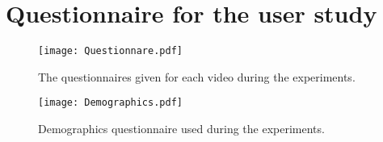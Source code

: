 \chapter{Questionnaire for the user study}
\begin{figure}[hbt!]
    \centering
    \texttt{[image: Questionnare.pdf]}
    \caption{The questionnaires given for each video during the experiments.}
    \label{fig:Questionnare}
\end{figure}

\begin{figure}[hbt!]
    \centering
    \texttt{[image: Demographics.pdf]}
    \caption{Demographics questionnaire used during the experiments.}
    \label{fig:Questionnare}
\end{figure}

%
